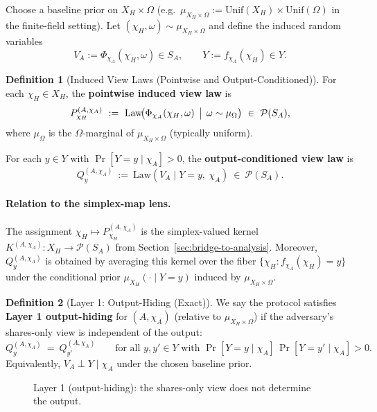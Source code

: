 \documentclass[11pt,a4paper]{article}
\theoremstyle{definition}
\newtheorem{definition}{Definition}[section]
\theoremstyle{plain}
\newcommand{\Prob}{\mathcal{P}}
\begin{document}
\smallskip
\noindent Choose a baseline prior on $X_H\times \Omega$ (e.g.\ $\mu_{X_H\times \Omega}:=\mathrm{Unif}(X_H)\times \mathrm{Unif}(\Omega)$ in the finite-field setting).
Let $(\chi_H,\omega)\sim \mu_{X_H\times \Omega}$ and define the induced random variables
\[
V_A:=\Phi_{\chi_A}(\chi_H,\omega)\in S_A,\qquad Y:=f_{\chi_A}(\chi_H)\in Y.
\]

\begin{definition}[Induced View Laws (Pointwise and Output-Conditioned)]
\label{def:view-law}
For each $\chi_H\in X_H$, the \textbf{pointwise induced view law} is
\[
P_{\chi_H}^{(A,\chi_A)} \ :=\ \mathrm{Law}\!\bigl(\Phi_{\chi_A}(\chi_H,\omega)\,\bigm|\,\omega\sim \mu_\Omega\bigr)\ \in\ \Prob(S_A),
\]
where $\mu_\Omega$ is the $\Omega$-marginal of $\mu_{X_H\times \Omega}$ (typically uniform).

For each $y\in Y$ with $\Pr[Y=y\mid \chi_A]>0$, the \textbf{output-conditioned view law} is
\[
Q_{y}^{(A,\chi_A)} \ :=\ \mathrm{Law}(V_A\mid Y=y,\ \chi_A)\ \in\ \Prob(S_A).
\]
\end{definition}

\paragraph{Relation to the simplex-map lens.}
The assignment $\chi_H\mapsto P_{\chi_H}^{(A,\chi_A)}$ is the simplex-valued kernel
$K^{(A,\chi_A)}:X_H\to\Prob(S_A)$ from Section~\ref{sec:bridge-to-analysis}.
Moreover, $Q_y^{(A,\chi_A)}$ is obtained by averaging this kernel over the fiber $\{\chi_H:f_{\chi_A}(\chi_H)=y\}$ under the conditional prior $\mu_{X_H}(\cdot\mid Y=y)$ induced by $\mu_{X_H\times \Omega}$.

\begin{definition}[Layer 1: Output-Hiding (Exact)]
\label{def:layer1}
We say the protocol satisfies \textbf{Layer 1 output-hiding} for $(A,\chi_A)$ (relative to $\mu_{X_H\times\Omega}$) if the adversary's shares-only view is independent of the output:
\[
Q_{y}^{(A,\chi_A)}\ =\ Q_{y'}^{(A,\chi_A)}\qquad\text{for all }y,y'\in Y\text{ with }\Pr[Y=y\mid \chi_A]\,\Pr[Y=y'\mid \chi_A]>0.
\]
Equivalently, $V_A\perp Y\mid \chi_A$ under the chosen baseline prior.
\end{definition}

\begin{figure}[ht]
\centering
{}
\caption{Layer 1 (output-hiding): the shares-only view does not determine the output.}
\label{fig:layer1-geometry}
\end{figure}
\end{document}
